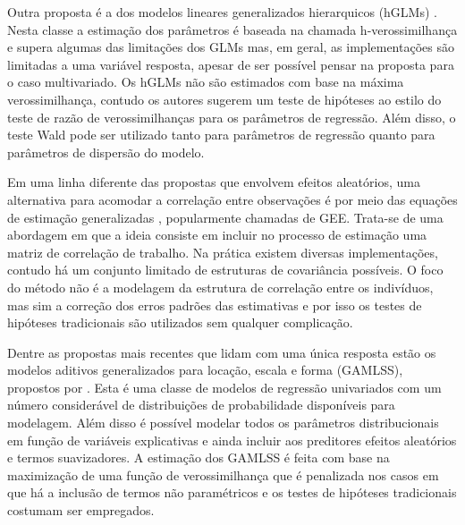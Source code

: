 
Outra proposta é a dos modelos lineares generalizados hierarquicos (hGLMs) \citep{lee1996hierarchical}. Nesta classe a estimação dos parâmetros é baseada na chamada h-verossimilhança e supera algumas das limitações dos GLMs mas, em geral, as implementações são limitadas a uma variável resposta, apesar de ser possível pensar na proposta para o caso multivariado. Os hGLMs não são estimados com base na máxima verossimilhança, contudo os autores sugerem um teste de hipóteses ao estilo do teste de razão de verossimilhanças para os parâmetros de regressão. Além disso, o teste Wald pode ser utilizado tanto para parâmetros de regressão quanto para parâmetros de dispersão do modelo.


Em uma linha diferente das propostas que envolvem efeitos aleatórios, uma alternativa para acomodar a correlação entre observações é por meio das equações de estimação generalizadas \citep{Liang86}, popularmente chamadas de GEE. Trata-se de uma abordagem em que a ideia consiste em incluir no processo de estimação uma matriz de correlação de trabalho. Na prática existem diversas implementações, contudo há um conjunto limitado de estruturas de covariância possíveis. O foco do método não é a modelagem da estrutura de correlação entre os indivíduos, mas sim a correção dos erros padrões das estimativas e por isso os testes de hipóteses tradicionais são utilizados sem qualquer complicação.


Dentre as propostas mais recentes que lidam com uma única resposta estão os modelos aditivos generalizados para locação, escala e forma (GAMLSS), propostos por \citet{stasinopoulos2008generalized}. Esta é uma classe de modelos de regressão univariados com um número considerável de distribuições de probabilidade disponíveis para modelagem. Além disso é possível modelar todos os parâmetros distribucionais em função de variáveis explicativas e ainda incluir aos preditores efeitos aleatórios e termos suavizadores. A estimação dos GAMLSS é feita com base na maximização de uma função de verossimilhança que é penalizada nos casos em que há a inclusão de termos não paramétricos e os testes de hipóteses tradicionais costumam ser empregados.


